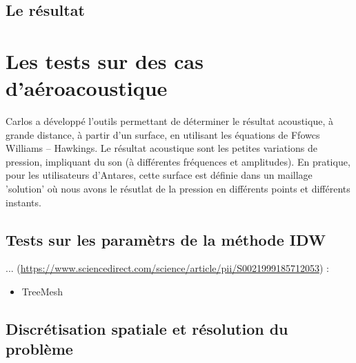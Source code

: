 \subsection{Le résultat}



\section{Les tests sur des cas d'aéroacoustique}
Carlos a développé l'outils permettant de déterminer le résultat acoustique, à grande distance, à partir d'un surface, en utilisant les équations de Ffowcs Williams – Hawkings. Le résultat acoustique sont les petites variations de pression, impliquant du son (à différentes fréquences et amplitudes). En pratique, pour les utilisateurs d'Antares, cette surface est définie dans un maillage 'solution' où nous avons le résutlat de la pression en différents points et différents instants.
\subsection{Tests sur les paramètrs de la méthode IDW}




... (\url{https://www.sciencedirect.com/science/article/pii/S0021999185712053}) : 


\begin{itemize}
    \item TreeMesh 
\end{itemize}

\begin{table}[ht]
    \setlength{\tabcolsep}{4pt} %
    \renewcommand{\arraystretch}{1.5} %
    \caption{Tableau des caractéristiques des maillages}
    \label{tab:maillages}
\end{table}

\subsection{Discrétisation spatiale et résolution du problème}